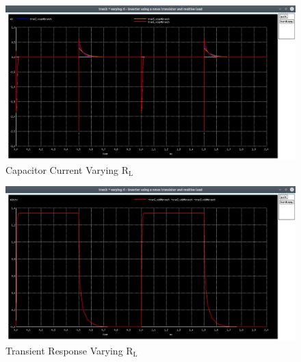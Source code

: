 \documentclass[12pt]{article}
\begin{document}
	\begin{figure}[H]
		\begin{center}
			\includegraphics[scale=0.25]{images/inverter_Rl_vcap.png}
			\caption{Capacitor Current Varying $\text{R}_\text{L}$}
			\label{fig::varying_rl_vcap}
		\end{center}
	\end{figure}
	
	\begin{figure}[H]
		\begin{center}
			\includegraphics[scale=0.25]{images/inverter_Rl_vdd.png}
			\caption{Transient Response Varying $\text{R}_\text{L}$}
			\label{fig::varying_rl_vdd}
		\end{center}
	\end{figure}
	
\end{document}
